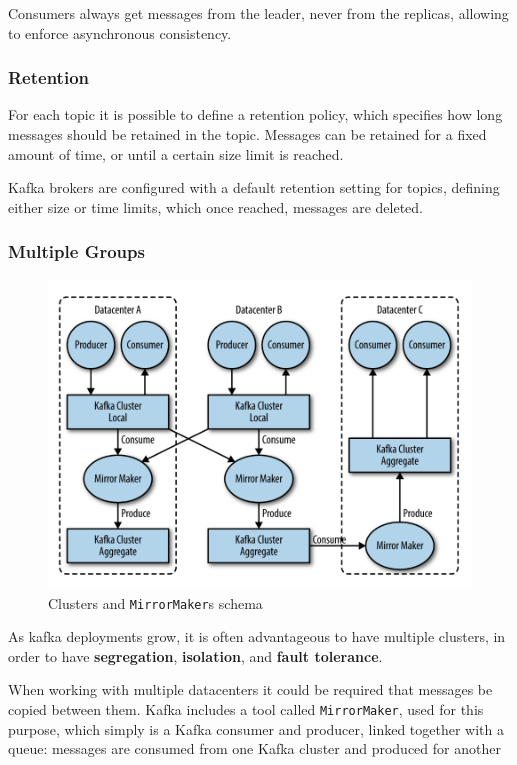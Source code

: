 Consumers always get messages from the leader, never from the replicas, allowing to enforce asynchronous consistency.

\subsubsection{Retention}

For each topic it is possible to define a retention policy, which specifies how long messages should be retained in the topic. Messages can be retained for a fixed amount of time, or until a certain size limit is reached.

Kafka brokers are configured with a default retention
setting for topics, defining either size or time limits, which once reached, messages are deleted.


\subsubsection{Multiple Groups}

\begin{figure}[htbp]
   \centering
   \includegraphics{images/16/clusters.png}
   \caption{Clusters and \texttt{MirrorMaker}s schema}
   \label{fig:16/clusters}
\end{figure}

As kafka deployments grow, it is often advantageous to have multiple clusters, in order to have \textbf{segregation}, \textbf{isolation}, and \textbf{fault tolerance}.

When working with multiple datacenters
it could be required that messages be
copied between them.
Kafka includes a tool called \texttt{MirrorMaker},
used for this purpose, which simply is a Kafka consumer and producer, linked together with a queue:
messages are consumed from one Kafka cluster and produced for another

